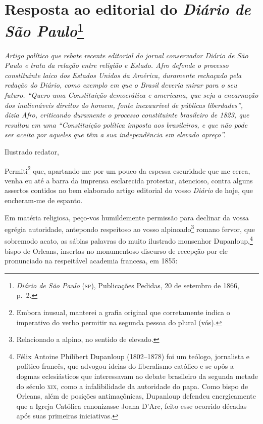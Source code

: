 \chapter{Resposta ao editorial do \emph{Diário de São Paulo}\footnote{
  \emph{Diário de São Paulo} (\textsc{sp}), Publicações Pedidas, 20 de setembro de 1866,
  p.~2.}}

\begin{didascalia}\itshape
Artigo político que rebate recente editorial do jornal conservador \textnormal{
Diário de São Paulo} e trata da relação entre religião e Estado. Afro
defende o processo constituinte laico dos Estados Unidos da
América, duramente rechaçado pela redação do \textnormal{Diário}, como exemplo
em que o Brasil deveria mirar para o seu futuro. ``Quero uma Constituição
democrática e americana, que seja a encarnação dos inalienáveis direitos
do homem, fonte inexaurível de públicas liberdades'', dizia Afro,
criticando duramente o processo constituinte brasileiro de 1823, que
resultou em uma ``Constituição política imposta aos brasileiros, e que não
pode ser aceita por aqueles que têm a sua independência em elevado
apreço''.
\end{didascalia}



Ilustrado redator,

Permiti\footnote{Embora inusual, manterei a grafia original que
  corretamente indica o imperativo do verbo permitir na segunda pessoa
  do plural (vós).} que, apartando-me por um pouco da espessa escuridade
que me cerca, venha eu até a barra da imprensa esclarecida protestar,
atencioso, contra alguns assertos contidos no bem elaborado artigo
editorial do vosso \emph{Diário} de hoje, que encheram-me de espanto.

Em matéria religiosa, peço-vos humildemente permissão para declinar da
vossa egrégia autoridade, antepondo respeitoso ao vosso
alpinoado\footnote{Relacionado a alpino, no sentido de elevado.}
romano fervor, que sobremodo acato, as sábias palavras do muito
ilustrado monsenhor Dupanloup,\footnote{Félix Antoine Philibert
  Dupanloup (1802--1878) foi um teólogo, jornalista e político francês,
  que advogou ideias do liberalismo católico e se opôs a dogmas
  eclesiásticos que interessavam ao debate brasileiro da segunda metade
  do século \textsc{xix}, como a infalibilidade da autoridade do papa. Como bispo
  de Orleans, além de posições antimaçônicas, Dupanloup defendeu
  energicamente que a Igreja Católica canonizasse Joana D'Arc, feito
  esse ocorrido décadas após suas primeiras iniciativas.} bispo de
Orleans, insertas no monumentoso discurso de recepção por ele
pronunciado na respeitável academia francesa, em 1855:


